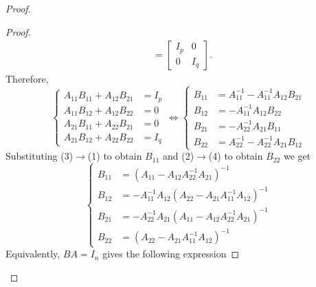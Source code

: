 \documentclass{article}
\theoremstyle{definition}
\theoremstyle{remark}
\begin{document}
\begin{proof}
\begin{proof}
\begin{align*}
&=\begin{bmatrix}
I_{p} & 0\\ 
0 & I_{q}
\end{bmatrix}.
\end{align*}
Therefore,
\begin{equation}
\left\{ \begin{array}{rl}
	A_{11}B_{11}+A_{12}B_{21} &=I_p \\ 
	A_{11}B_{12}+A_{12}B_{22}&=0 \\ 
	A_{21}B_{11}+A_{22}B_{21}&=0\\
	A_{21}B_{12}+A_{22}B_{22}&=I_q
\end{array} \right. 
\Leftrightarrow
\left\{ \begin{array}{rl}
	B_{11}&=A_{11}^{-1}-A_{11}^{-1}A_{12}B_{21} \\ 
	B_{12}&=-A_{11}^{-1}A_{12}B_{22} \\ 
	B_{21}&=-A_{22}^{-1}A_{21}B_{11}\\
	B_{22}&=A_{22}^{-1}-A_{22}^{-1}A_{21}B_{12}
\end{array} \right. 
\end{equation}
Substituting (3)$\rightarrow$(1) to obtain $B_{11}$ and (2)$\rightarrow$(4) to obtain $B_{22}$ we get
\begin{equation}
\left\{ \begin{array}{rl}
	B_{11}&=\left( A_{11}-A_{12}A_{22}^{-1}A_{21} \right)^{-1}\\ 
	B_{12}&=-A_{11}^{-1}A_{12}\left( A_{22}-A_{21}A_{11}^{-1}A_{12} \right)^{-1} \\ 
	B_{21}&=-A_{22}^{-1}A_{21}\left( A_{11}-A_{12}A_{22}^{-1}A_{21} \right)^{-1}\\
	B_{22}&=\left( A_{22}-A_{21}A_{11}^{-1}A_{12} \right)^{-1}
\end{array} \right. 
\end{equation}
Equivalently, $BA=I_n$ gives the following expression



\end{proof}
\end{proof}
\end{document}
